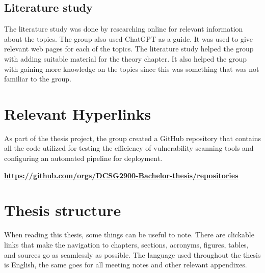 \subsection{Literature study}
The literature study was done by researching online for relevant information about the topics. The group also used ChatGPT as a guide. It was used to give relevant web pages for each of the topics. The literature study helped the group with adding suitable material for the theory chapter. It also helped the group with gaining more knowledge on the topics since this was something that was not familiar to the group. 

\section{Relevant Hyperlinks}
As part of the thesis project, the group created a GitHub repository that contains all the code utilized for testing the efficiency of vulnerability scanning tools and configuring an automated pipeline for deployment. 

\href{https://github.com/orgs/DCSG2900-Bachelor-thesis/repositories}{\textbf{https://github.com/orgs/DCSG2900-Bachelor-thesis/repositories}}

\section{Thesis structure}
When reading this thesis, some things can be useful to note. There are clickable links that make the navigation to chapters, sections, acronyms, figures, tables, and sources go as seamlessly as possible. The language used throughout the thesis is English, the same goes for all meeting notes and other relevant appendixes. 


